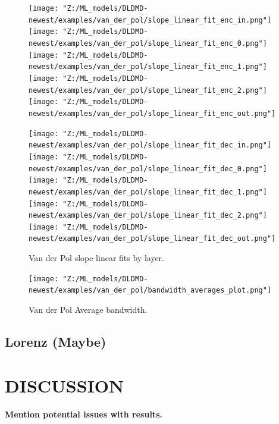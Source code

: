 \begin{figure}[p]
    \centering
    \begin{minipage}{.5\textwidth}
        \texttt{[image: "Z:/ML\_models/DLDMD-newest/examples/van\_der\_pol/slope\_linear\_fit\_enc\_in.png"]} 
        \texttt{[image: "Z:/ML\_models/DLDMD-newest/examples/van\_der\_pol/slope\_linear\_fit\_enc\_0.png"]} 
        \texttt{[image: "Z:/ML\_models/DLDMD-newest/examples/van\_der\_pol/slope\_linear\_fit\_enc\_1.png"]} 
        \texttt{[image: "Z:/ML\_models/DLDMD-newest/examples/van\_der\_pol/slope\_linear\_fit\_enc\_2.png"]} 
        \texttt{[image: "Z:/ML\_models/DLDMD-newest/examples/van\_der\_pol/slope\_linear\_fit\_enc\_out.png"]} 
    \end{minipage}%
    \begin{minipage}{.5\textwidth}
        \texttt{[image: "Z:/ML\_models/DLDMD-newest/examples/van\_der\_pol/slope\_linear\_fit\_dec\_in.png"]} 
        \texttt{[image: "Z:/ML\_models/DLDMD-newest/examples/van\_der\_pol/slope\_linear\_fit\_dec\_0.png"]} 
        \texttt{[image: "Z:/ML\_models/DLDMD-newest/examples/van\_der\_pol/slope\_linear\_fit\_dec\_1.png"]} 
        \texttt{[image: "Z:/ML\_models/DLDMD-newest/examples/van\_der\_pol/slope\_linear\_fit\_dec\_2.png"]} 
        \texttt{[image: "Z:/ML\_models/DLDMD-newest/examples/van\_der\_pol/slope\_linear\_fit\_dec\_out.png"]} 
    \end{minipage}
    \caption{Van der Pol slope linear fits by layer.}
    \label{fig:van der pol slopes all layers}
\end{figure}

\begin{figure}[ht]
    \centering
    \begin{minipage}{\textwidth}
        \texttt{[image: "Z:/ML\_models/DLDMD-newest/examples/van\_der\_pol/bandwidth\_averages\_plot.png"]} 
    \end{minipage} 
    \caption{Van der Pol Average bandwidth.}
\end{figure}

\section{Lorenz (Maybe)}

\chapter{DISCUSSION}
\label{chap:discussion}

\textbf{Mention potential issues with results.}

